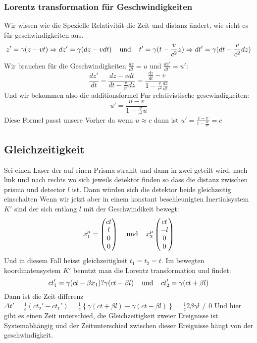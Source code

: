 \documentclass{article}
\newcommand{\mspc}{\hspace{0.4cm}}
\begin{document}
\subsubsection{Lorentz transformation für Geschwindigkeiten} Wir wissen wie die Spezielle Relativität die Zeit und distanz ändert, wie sieht es für geschwindigkeiten aus.
\[z'=\gamma(z-vt)\Rightarrow dz'=\gamma(dz-vdt)\mspc\text{und}\mspc t'=\gamma(t-\frac{v}{c^2}z)\Rightarrow dt'=\gamma(dt-\frac{v}{c^2}dz)\]
Wir brauchen für die Geschwindigkeiten $\frac{dz}{dt}=u$ und $\frac{dz'}{dt'}=u'$:
\[\frac{dz'}{dt}=\frac{dz-vdt}{dt-\frac{v}{c^2}dz}=\frac{\frac{dz}{dt}-v}{1-\frac{v}{c^2}\frac{dz}{dt}}\]Und wir bekommen also die additionsformel Fur relativistische gescwindigkeiten:
\[\boxed{u'=\frac{u-v}{1-\frac{v}{c^2}u}}\]
Diese Formel passt unsere Vorher da wenn $u\approx c$ dann ist $u'=\frac{c-v}{1-\frac{vc}{c^2}}=c$ 
\subsection{Gleichzeitigkeit}
Sei einen Laser der auf einen Prisma strahlt und dann in zwei geteilt wird, nach link und nach rechts wo sich jeweils detektor finden so dass die distanz zwischen prisma und detector $l$ ist. Dann würden sich die detektor beide gleichzeitig einschalten
Wenn wir jetzt aber in einem konstant beschleunigten Inertialsystem $K'$ sind der sich entlang $l$ mit der Geschwindikeit bewegt:
\[x_1^\mu=\begin{pmatrix}ct\\l\\0\\0\end{pmatrix}\mspc\text{und}\mspc x_2^\mu\begin{pmatrix}ct\\-l\\0\\0\end{pmatrix}\] Und in diesem Fall heisst gleichzeitigkeit $t_1=t_2=t$. Im bewegten koordinatensystem $K'$ benutzt man die Lorentz transformation und findet:
\[ct_1'=\gamma(ct-\beta x_1)?\gamma(ct-\beta l)\mspc\text{und}\mspc ct_2'=\gamma(ct+\beta l)\] Dann ist die Zeit differenz 
$\Delta t' =\frac{1}{c}(ct_2'-ct_1')=\frac{1}{c}\left\lbrace\gamma(ct+\beta l)-\gamma(ct-\beta l)\right\rbrace=\frac{1}{c}2\beta\gamma l\neq 0$ 
Und hier gibt es einen Zeit unterschied, die Gleichzeitigkeit zweier Ereignisse ist Systemabhängig und der Zeitunterschied zwischen dieser Ereignisse hängt von der geschwindigkeit.
\end{document}
